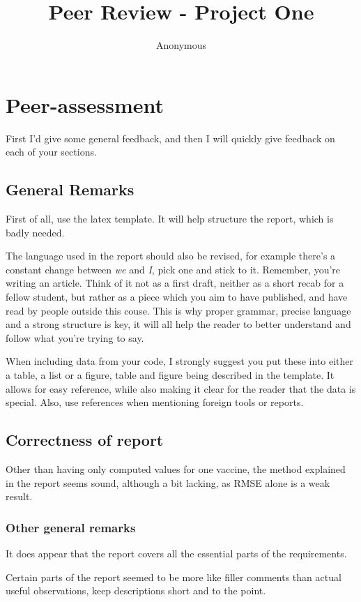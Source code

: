 \documentclass[11pt]{article} %
\title{Peer Review - Project One}
\author{Anonymous}
\begin{document}
\maketitle

\section*{Peer-assessment}
First I'd give some general feedback, and then I will quickly give feedback on each of your sections.
\subsection*{General Remarks}
First of all, use the latex template. It will help structure the report, which is badly needed.

The language used in the report should also be revised, for example there's a constant change between \textit{we} and \textit{I}, pick one and stick to it. Remember, you're writing an article. Think of it not as a first draft, neither as a short recab for a fellow student, but rather as a piece which you aim to have published, and have read by people outside this couse. This is why proper grammar, precise language and a strong structure is key, it will all help the reader to better understand and follow what you're trying to say.

When including data from your code, I strongly suggest you put these into either a table, a list or a figure, table and figure being described in the template. It allows for easy reference, while also making it clear for the reader that the data is special. Also, use references when mentioning foreign tools or reports.

\subsection*{Correctness of report}
Other than having only computed values for one vaccine, the method explained in the report seems sound, although a bit lacking, as RMSE alone is a weak result.

\subsubsection*{Other general remarks}
It does appear that the report covers all the essential parts of the requirements.

Certain parts of the report seemed to be more like filler comments than actual useful observations, keep descriptions short and to the point.
\end{document}
